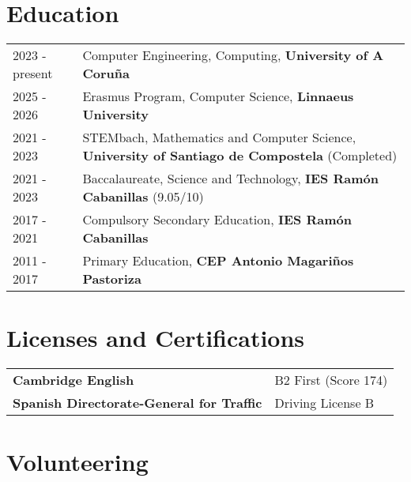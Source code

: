 \documentclass[a4paper,12pt]{article}
\begin{document}
\section{Education}
\begin{tabularx}{\linewidth}{@{}l X@{}}
2023 - present & Computer Engineering, Computing, \textbf{University of A Coruña} \hfill \normalsize \\

2025 - 2026 & Erasmus Program, Computer Science, \textbf{Linnaeus University} \\

2021 - 2023 & STEMbach, Mathematics and Computer Science, \textbf{University of Santiago de Compostela} \hfill  (Completed) \\

2021 - 2023 & Baccalaureate, Science and Technology, \textbf{IES Ramón Cabanillas} \hfill  (9.05/10) \\

2017 - 2021 & Compulsory Secondary Education, \textbf{IES Ramón Cabanillas} \\

2011 - 2017 & Primary Education, \textbf{CEP Antonio Magariños Pastoriza} \\
\end{tabularx}


\section{Licenses and Certifications}

\begin{tabularx}{\linewidth}{@{}l X@{}}
\textbf{Cambridge English} & B2 First \hfill \normalsize (Score 174)\\

\textbf{Spanish Directorate-General for Traffic} & Driving License B \\

\end{tabularx}


\section{Volunteering}
\end{document}
